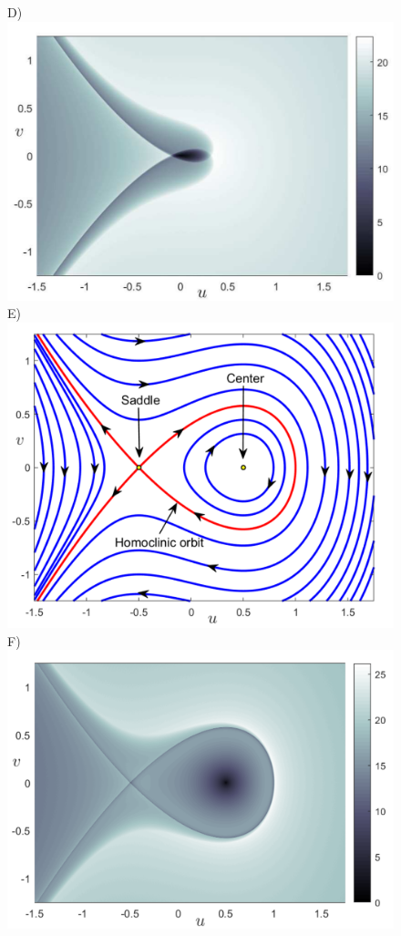 \documentclass{ws-ijbc}
\begin{document}
\begin{figure}[htbp]
\begin{center}
		D)\includegraphics[scale=0.36]{fig1d}
		E)\includegraphics[scale=0.32]{fig1e}
		F)\includegraphics[scale=0.36]{fig1f}

\end{center}
\end{figure}
\end{document}
